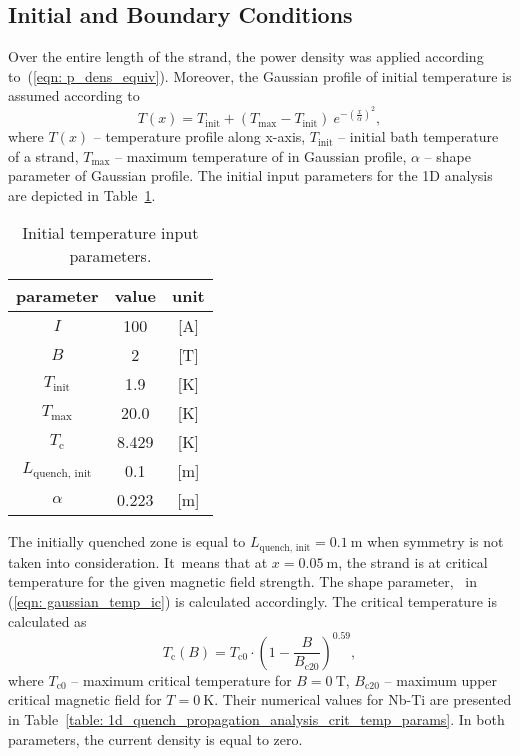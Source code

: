 \subsection{Initial and Boundary Conditions}

Over the entire length of the strand, the power density was applied according to~(\ref{eqn: p_dens_equiv}). Moreover, the Gaussian profile of initial temperature is assumed according to 
\begin{equation}
    T(x) = T_\text{init} + (T_\text{max} - T_\text{init}) ~ e^{-(\frac{x}{\alpha})^2},
    \label{eqn: gaussian_temp_ic}
\end{equation}
where $T(x)$ -- temperature profile along x-axis, $T_\text{init}$ -- initial bath temperature of a strand, $T_\text{max}$ -- maximum temperature of in Gaussian profile, $\alpha$ -- shape parameter of Gaussian profile. The initial input parameters for the 1D analysis are depicted in Table~\ref{table: 1d_quench_propagation_analysis_init_temp_input_parameters}. 

\begin{table}[H]
    \caption{Initial temperature input parameters.} 
    \vspace{-1.em} 
    \fontsize{10}{10}
    \selectfont 
    \renewcommand{\arraystretch}{1.5}
    \begin{center}
        \begin{tabular}{ ccc }  
        \hline
        parameter & value & unit \\
        \hline
        $I$ & 100 & [A] \\
        $B$ & 2 & [T] \\
        $T_\text{init}$ & 1.9 & [K] \\
        $T_\text{max}$ & 20.0 & [K] \\
        $T_\text{c}$ & 8.429 & [K] \\
        $L_\text{quench, init}$ & 0.1 & [m] \\ 
        $\alpha$ & 0.223 & [m] \\   
        \hline 
        \end{tabular}
    \end{center}  
     \label{table: 1d_quench_propagation_analysis_init_temp_input_parameters} 
 \end{table}

The initially quenched zone is equal to $L_\text{quench, init}= 0.1~\text{m}$ when symmetry is not taken into consideration. It~means that at $x=0.05~\text{m}$, the strand is at critical temperature for the given magnetic field strength. The shape parameter, \textalpha~in (\ref{eqn: gaussian_temp_ic}) is calculated accordingly. The critical temperature is calculated as
\begin{equation}
    T_\text{c}(B) = T_\text{c0}\cdot(1-\frac{B}{B_\text{c20}})^{0.59},
\end{equation}
where $T_\text{c0}$ -- maximum critical temperature for $B=0~\text{T}$, $B_\text{c20}$ -- maximum upper critical magnetic field for $T=0~\text{K}$. Their numerical values for Nb-Ti are presented in Table~\ref{table: 1d_quench_propagation_analysis_crit_temp_params}. In both parameters, the current density is equal to zero. 


